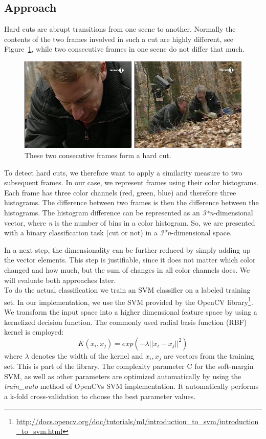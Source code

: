 \subsection{Approach}
\label{sec:hard_cut_approach}

Hard cuts are abrupt transitions from one scene to another.
Normally the contents of the two frames involved in such a cut are highly different, see Figure~\ref{fig:hard_cut_example}, while two consecutive frames in one scene do not differ that much.

\begin{figure}
	\centering
	\includegraphics[scale=.7]{images/hard_cut_example.png}
	\caption{These two consecutive frames form a hard cut.}
	\label{fig:hard_cut_example}
\end{figure}

To detect hard cuts, we therefore want to apply a similarity measure to two subsequent frames.
In our case, we represent frames using their color histograms.
Each frame has three color channels (red, green, blue) and therefore three histograms.
The difference between two frames is then the difference between the histograms.
The histogram difference can be represented as an \emph{3*n}-dimensional vector, where \emph{n} is the number of bins in a color histogram.
So, we are presented with a binary classification task (cut or not) in a \emph{3*n}-dimensional space.

In a next step, the dimensionality can be further reduced by simply adding up the vector elements.
This step is justifiable, since it does not matter which color changed and how much, but the sum of changes in all color channels does.
We will evaluate both approaches later. \\
To do the actual classification we train an SVM classifier on a labeled training set.
In our implementation, we use the SVM provided by the OpenCV library\footnote{\url{http://docs.opencv.org/doc/tutorials/ml/introduction_to_svm/introduction_to_svm.html}}.
We transform the input space into a higher dimensional feature space by using a kernelized decision function. The commonly used radial basis function (RBF) kernel is employed:
$$K(x_i,x_j) = exp(-\lambda || x_i - x_j ||^2)$$
where $\lambda$ denotes the width of the kernel and $x_i, x_j $ are vectors from the training set.
This is part of the library.
The complexity parameter C for the soft-margin SVM, as well as other parameters are optimized automatically by using the \emph{train\_auto} method of OpenCVs SVM implementation.
It automatically performs a k-fold cross-validation to choose the best parameter values.
